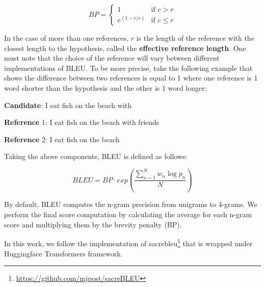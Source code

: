 \begin{equation}
    BP=\begin{cases} 1 & \mbox{if } c>r \\ e^{(1-r/c)} & \mbox{if } c\le r \end{cases}
\end{equation}

In the case of more than one references, $r$ is the length of the reference with the closest length to the hypothesis, called the \textbf{effective reference length}. One must note that the choice of the reference will vary between different implementations of BLEU. To be more precise, take the following example that shows the difference between two references is equal to 1 where one reference is 1 word shorter than the hypothesis and the other is 1 word longer:

\bigskip

\textbf{Candidate}: I eat fish on the beach with

\textbf{Reference} 1: I eat fish on the beach with friends

\textbf{Reference} 2: I eat fish on the beach

\bigskip

Taking the above components, BLEU is defined as follows:

\begin{equation}
    BLEU=BP\cdot exp\left( \frac{\sum_{n=1}^{N} w_n \log p_n}{N} \right)
\end{equation}

By default, BLEU computes the n-gram precision from unigrams to 4-grams. We perform the final score computation by calculating the average for each n-gram score and multiplying them by the brevity penalty (BP).

In this work, we follow the implementation of sacrebleu\footnote{\url{https://github.com/mjpost/sacreBLEU}}  that is wrapped under Huggingface Transformers framework.